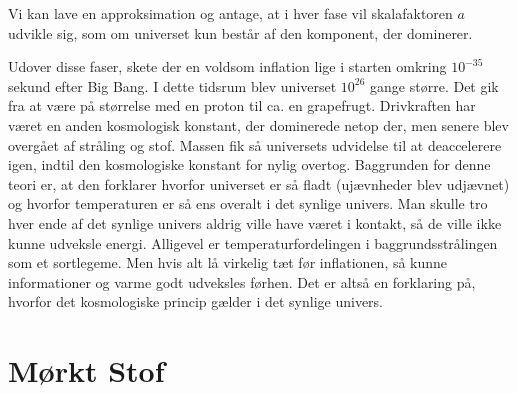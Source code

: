Vi kan lave en approksimation og antage, at i hver fase vil skalafaktoren $a$ udvikle sig, som om universet kun består af den komponent, der dominerer.

Udover disse faser, skete der en voldsom inflation lige i starten omkring $10^{-35}$ sekund efter Big Bang. I dette tidsrum blev universet $10^{26}$ gange større. Det gik fra at være på størrelse med en proton til ca. en grapefrugt. Drivkraften har været en anden kosmologisk konstant, der dominerede netop der, men senere blev overgået af stråling og stof. Massen fik så universets udvidelse til at deaccelerere igen, indtil den kosmologiske konstant for nylig overtog. Baggrunden for denne teori er, at den forklarer hvorfor universet er så fladt (ujævnheder blev udjævnet) og hvorfor temperaturen er så ens overalt i det synlige univers. Man skulle tro hver ende af det synlige univers aldrig ville have været i kontakt, så de ville ikke kunne udveksle energi. Alligevel er temperaturfordelingen i baggrundsstrålingen som et sortlegeme. Men hvis alt lå virkelig tæt før inflationen, så kunne informationer og varme godt udveksles førhen. Det er altså en forklaring på, hvorfor det kosmologiske princip gælder i det synlige univers.


\section{Mørkt Stof} \label{DM}

